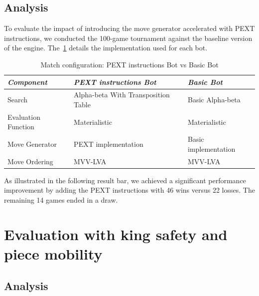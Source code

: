 \subsection*{Analysis}

\noindent To evaluate the impact of introducing the move generator accelerated with PEXT instructions, we conducted the 100-game tournament against the baseline version of the engine. The~\cref{tab:pext_vs_basic} details the implementation used for each bot.

\vspace{1em}

\begin{table}
    \centering
    \begin{tabular}{|p{4cm}|p{4cm}|p{4cm}|}
    \hline
    \textit{Component}         & \textit{PEXT instructions Bot}  & \textit{Basic Bot}     \\ \hline
    Search                     & Alpha-beta With Transposition Table          & Basic Alpha-beta           \\ \hline
    Evaluation Function        & Materialistic                      & Materialistic       \\ \hline
    Move Generator             & PEXT implementation              & Basic implementation   \\ \hline
    Move Ordering              & MVV-LVA                           & MVV-LVA                \\ \hline
    \end{tabular}
    \caption{Match configuration: PEXT instructions Bot vs Basic Bot}\label{tab:pext_vs_basic}
\end{table}

\noindent As illustrated in the following result bar, we achieved a significant performance improvement by adding the PEXT instructions with 46 wins versus 22 losses. The remaining 14 games ended in a draw.

\begin{center}
\medskip
\end{center}

\section{Evaluation with king safety and piece mobility}

\subsection*{Analysis}

